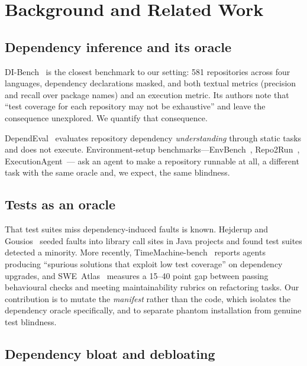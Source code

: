 \documentclass[10pt,conference]{IEEEtran}
\newcommand{\dibench}{DI-Bench}
\begin{document}
\section{Background and Related Work}
\label{sec:related}

\subsection{Dependency inference and its oracle}

\dibench~\cite{dibench2025} is the closest benchmark to our setting: 581
repositories across four languages, dependency declarations masked, and
both textual metrics (precision and recall over package names) and an
execution metric. Its authors note that ``test coverage for each
repository may not be exhaustive'' and leave the consequence unexplored.
We quantify that consequence.

DependEval~\cite{dependeval2025} evaluates repository dependency
\emph{understanding} through static tasks and does not execute.
Environment-setup benchmarks---EnvBench~\cite{envbench2025},
Repo2Run~\cite{repo2run2025}, ExecutionAgent~\cite{executionagent2025}---
ask an agent to make a repository runnable at all, a different task with
the same oracle and, we expect, the same blindness.

\subsection{Tests as an oracle}

That test suites miss dependency-induced faults is known. Hejderup and
Gousios~\cite{hejderup2022trust} seeded faults into library call sites in
Java projects and found test suites detected a minority. More recently,
TimeMachine-bench~\cite{timemachine2026} reports agents producing
``spurious solutions that exploit low test coverage'' on dependency
upgrades, and SWE~Atlas~\cite{sweatlas2026} measures a 15--40 point gap
between passing behavioural checks and meeting maintainability rubrics on
refactoring tasks. Our contribution is to mutate the \emph{manifest}
rather than the code, which isolates the dependency oracle specifically,
and to separate phantom installation from genuine test blindness.

\subsection{Dependency bloat and debloating}
\end{document}

